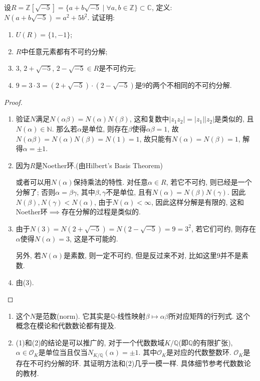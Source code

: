 \begin{problem}
    设$R = \mathbb{Z}[\sqrt{-5}] = \{a + b\sqrt{-5} \mid \forall a, b \in\mathbb{Z}\} \subset \mathbb{C}$, 定义: $N(a + b\sqrt{-5}) = a^2 + 5b^2$. 试证明:
    \begin{enumerate}[(1)]
        \item $U(R) = \{1, -1\}$;
        \item $R$中任意元素都有不可约分解;
        \item $3$, $2 + \sqrt{-5}$, $2 - \sqrt{-5} \in R$是不可约元;
        \item $9 = 3 \cdot 3= (2 + \sqrt{-5}) \cdot (2 - \sqrt{-5})$是$9$的两个不相同的不可约分解.
    \end{enumerate}
\end{problem}

\begin{proof}
    \begin{enumerate}[(1)]
        \item 验证$N$满足$N(\alpha\beta) = N(\alpha)N(\beta)$, 这和复数中$|z_1z_2| = |z_1||z_2|$是类似的, 且$N(\alpha) \in \mathbb{N}$. 那么若$\alpha$是单位, 则存在$\beta$使得$\alpha\beta = 1$, 故$N(\alpha\beta) = N(\alpha)N(\beta) = N(1) = 1$, 故只能有$N(\alpha) = N(\beta) = 1$, 解得$\alpha = \pm 1$.
        \item 因为$R$是Noether环.(由Hilbert's Basis Theorem)
        
        或者可以用$N(\alpha)$保持乘法的特性. 对任意$\alpha \in R$, 若它不可约, 则已经是一个分解了; 否则$\alpha = \beta\gamma$, 其中$\beta, \gamma$不是单位, 且有$N(\alpha) = N(\beta)N(\gamma)$. 因此$N(\beta), N(\gamma) < N(\alpha)$, 由于$N(\alpha) < \infty$, 因此这样分解是有限的, 这和Noether环$\implies$存在分解的过程是类似的.
        \item 由于$N(3) = N(2 + \sqrt{-5}) = N(2 - \sqrt{-5}) = 9 = 3^2$, 若它们可约, 则存在$\alpha$使得$N(\alpha) = 3$, 这是不可能的.
    
        另外, 若$N(\alpha)$是素数, 则一定不可约, 但是反过来不对, 比如这里$9$并不是素数.
        \item 由(3).
    \end{enumerate}
\end{proof}

\begin{remark}
    \begin{enumerate}[1.]
        \item 这个$N$是范数(norm). 它其实是$\mathbb{Q}$-线性映射$\beta \mapsto \alpha\beta$所对应矩阵的行列式. 这个概念在模论和代数数论都有提及.
        \item (1)和(2)的结论是可以推广的, 对于一个代数数域$K/\mathbb{Q}$(即$\mathbb{Q}$的有限扩张), $\alpha \in \mathcal{O}_K$是单位当且仅当$N_{K/\mathbb{Q}}(\alpha) = \pm1$. 其中$\mathcal{O}_K$是对应的代数整数环. $\mathcal{O}_K$是存在不可约分解的环. 其证明方法和(2)几乎一模一样. 具体细节参考代数数论的教材.
    \end{enumerate}
\end{remark}

